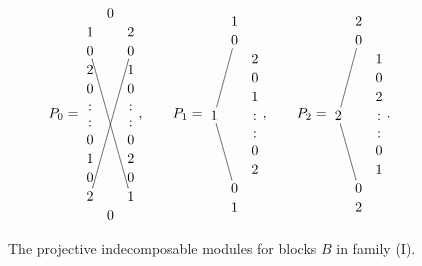\documentclass{amsart}
\theoremstyle{plain}
\theoremstyle{definition}
\theoremstyle{remark}
\begin{document}
\begin{figure}[ht] 
\caption{\label{fig:psl1B} The projective indecomposable
modules for blocks $B$ in family (I).}
$$P_0=\vcenter{ \xymatrix @R=.1pc @C=.3pc{&0&\\
1&&2\\0\ar@{-}[rrdddddddd]&&0\ar@{-}[lldddddddd]\\2&&1\\0&&0\\:&&:\\:&&:\\0&&0\\1&&2\\0&&0\\2&&1\\&0&}},
\qquad P_1=\vcenter{ \xymatrix @R=.1pc @C=.3pc{&1&\\&0\ar@{-}[ldddd]&\\&&2\\&&0\\&&1\\
1\ar@{-}[rdddd]&&:\\&&:\\&&0\\&&2\\&0&\\&1&}}, 
\qquad P_2=\vcenter{ \xymatrix @R=.1pc @C=.3pc{&2&\\&0\ar@{-}[ldddd]&\\&&1\\&&0\\&&2\\
2\ar@{-}[rdddd]&&:\\&&:\\&&0\\&&1\\&0&\\&2&}}.$$
\end{figure}
\end{document}

